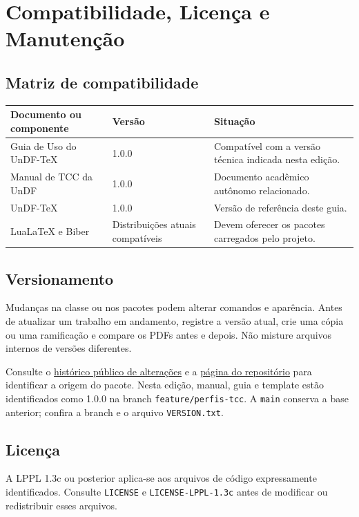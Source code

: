 \chapter{Compatibilidade, Licença e Manutenção}

\section{Matriz de compatibilidade}

\begin{longtable}{p{}p{}p{}}
\toprule
\textbf{Documento ou componente} & \textbf{Versão} & \textbf{Situação} \\
\midrule
\endhead
Guia de Uso do UnDF-TeX & 1.0.0 & Compatível com a versão técnica indicada nesta edição. \\
Manual de TCC da UnDF & 1.0.0 & Documento acadêmico autônomo relacionado. \\
UnDF-TeX & 1.0.0 & Versão de referência deste guia. \\
LuaLaTeX e Biber & Distribuições atuais compatíveis & Devem oferecer os pacotes carregados pelo projeto. \\
\bottomrule
\end{longtable}

\section{Versionamento}

Mudanças na classe ou nos pacotes podem alterar comandos e aparência. Antes de atualizar um trabalho em andamento, registre a versão atual, crie uma cópia ou uma ramificação e compare os PDFs antes e depois. Não misture arquivos internos de versões diferentes.

Consulte o \href{https://github.com/igormrqs/undftex/blob/feature/perfis-tcc/CHANGELOG.md}{histórico público de alterações}
e a \href{https://github.com/igormrqs/undftex}{página do repositório}
para identificar a origem do pacote. Nesta edição, manual, guia e template
estão identificados como 1.0.0 na branch \texttt{feature/perfis-tcc}. A
\texttt{main} conserva a base anterior; confira a branch e o arquivo \texttt{VERSION.txt}.

\section{Licença}

A LPPL 1.3c ou posterior aplica-se aos arquivos de código expressamente identificados. Consulte \texttt{LICENSE} e \texttt{LICENSE-LPPL-1.3c} antes de modificar ou redistribuir esses arquivos.

